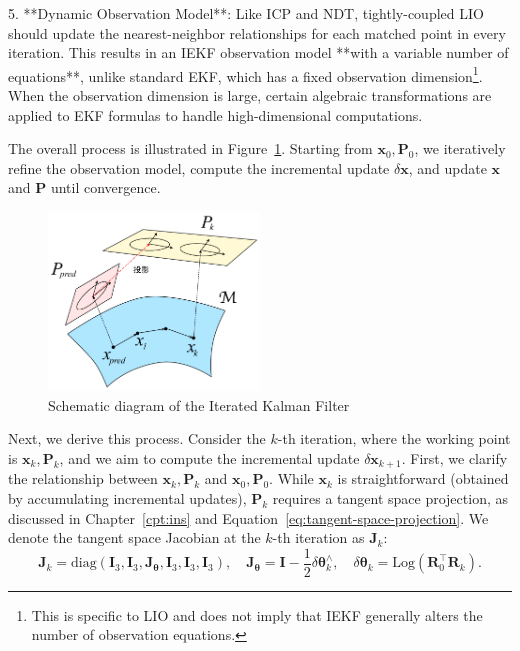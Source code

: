 5. **Dynamic Observation Model**: Like ICP and NDT, tightly-coupled LIO should update the nearest-neighbor relationships for each matched point in every iteration. This results in an IEKF observation model **with a variable number of equations**, unlike standard EKF, which has a fixed observation dimension\footnote{This is specific to LIO and does not imply that IEKF generally alters the number of observation equations.}. When the observation dimension is large, certain algebraic transformations are applied to EKF formulas to handle high-dimensional computations.  

The overall process is illustrated in Figure~\ref{fig:iekf-iters}. Starting from \(\bm{x}_0, \bm{P}_0\), we iteratively refine the observation model, compute the incremental update \(\delta \bm{x}\), and update \(\bm{x}\) and \(\bm{P}\) until convergence.  

\begin{figure}[!htp]  
	\centering  
	\includegraphics[width=0.5\textwidth]{resources/lio/iekf-iters.pdf}  
	\caption{Schematic diagram of the Iterated Kalman Filter}  
	\label{fig:iekf-iters}  
\end{figure}  

Next, we derive this process. Consider the \(k\)-th iteration, where the working point is \(\bm{x}_{k}, \bm{P}_{k}\), and we aim to compute the incremental update \(\delta \bm{x}_{k+1}\). First, we clarify the relationship between \(\bm{x}_{k}, \bm{P}_{k}\) and \(\bm{x}_0, \bm{P}_0\). While \(\bm{x}_{k}\) is straightforward (obtained by accumulating incremental updates), \(\bm{P}_{k}\) requires a tangent space projection, as discussed in Chapter~\ref{cpt:ins} and Equation~\eqref{eq:tangent-space-projection}. We denote the tangent space Jacobian at the \(k\)-th iteration as \(\bm{J}_k\):  
\begin{equation}\label{key}  
	\bm{J}_k = \mathrm{diag}(\bm{I}_3, \bm{I}_3, \bm{J}_{\boldsymbol{\theta}}, \bm{I}_3, \bm{I}_3, \bm{I}_3), \quad \bm{J}_{\boldsymbol{\theta}} = \bm{I} - \frac{1}{2} \delta \boldsymbol{\theta}_k^\wedge, \quad \delta \boldsymbol{\theta}_k = \mathrm{Log}(\bm{R}_0^\top \bm{R}_k).  
\end{equation}  

